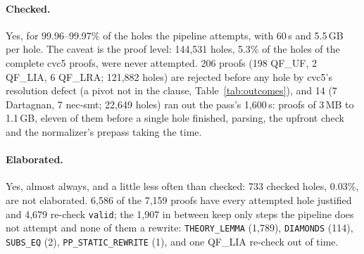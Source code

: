 \documentclass[11pt,a4paper]{article}
\newcommand{\UF}{QF\_UF}
\newcommand{\LIA}{QF\_LIA}
\newcommand{\LRA}{QF\_LRA}
\newcommand{\code}[1]{\texttt{#1}}
\begin{document}
\begin{table}[htbp]\centering\footnotesize
\resizebox{\textwidth}{!}{}
\caption{\code{rw5} on the proofs whose elaboration pass ran to its
  summary. ``checked'' and ``justified among the checked'' are ranges
  because of the undetermined holes.}\label{tab:rw5q}
\end{table}

\paragraph{Checked.} Yes, for 99.96--99.97\% of the holes the pipeline
attempts, with 60\,s and 5.5\,GB per hole. The caveat is the proof level:
144,531 holes, 5.3\% of the holes of the complete cvc5 proofs, were never
attempted. 206 proofs (198 \UF{}, 2 \LIA{}, 6 \LRA{}; 121,882 holes) are
rejected before any hole by cvc5's resolution defect (a pivot not in the
clause, Table~\ref{tab:outcomes}), and 14 (7 Dartagnan, 7 nec-smt; 22,649
holes) ran out the pass's 1,600\,s: proofs of 3\,MB to 1.1\,GB, eleven of
them before a single hole finished, parsing, the upfront check and the
normalizer's prepass taking the time.

\paragraph{Elaborated.} Yes, almost always, and a little less often than
checked: 733 checked holes, 0.03\%, are not elaborated. 6,586 of the 7,159
proofs have every attempted hole justified and 4,679 re-check
\code{valid}; the 1,907 in between keep only steps the pipeline does not
attempt and none of them a rewrite: \code{THEORY\_LEMMA} (1,789),
\code{DIAMONDS} (114), \code{SUBS\_EQ} (2), \code{PP\_STATIC\_REWRITE} (1),
and one \LIA{} re-check out of time.
\end{document}
